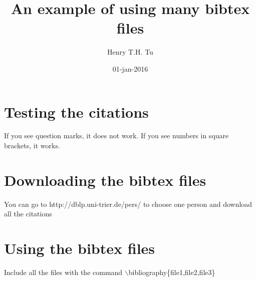 \documentclass{article}
\title{An example of using many bibtex files}
\author{Henry T.H. Tu}
\date{01-jan-2016}
\begin{document}
\maketitle

\section{Testing the citations}
If you see question marks, it does not work. If you see numbers in square brackets, it works.
\cite{DBLP:conf/caip/AmengualBR15,DBLP:conf/icinco/BoschCRF12}

\section{Downloading the bibtex files}
You can go to http://dblp.uni-trier.de/pers/ to choose one person and download all the citations

\section{Using the bibtex files}

Include all the files with the command $\backslash$bibliography\{file1,file2,file3\}

\nocite{*}




\end{document}
